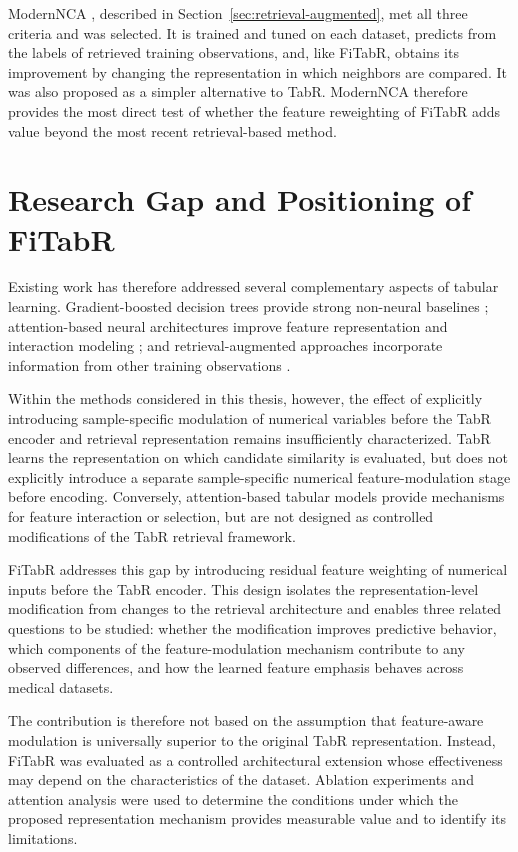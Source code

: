 \documentclass[11pt,a4paper,oneside, openany, reqno, chapter, nokorean]{oblivoir}
\theoremstyle{definition}
\theoremstyle{remark}
\numberwithin{equation}{chapter}
\theoremstyle{definition}
\theoremstyle{remark}
\theoremstyle{definition}
\begin{document}
ModernNCA \cite{ye2025modernnca}, described in
Section~\ref{sec:retrieval-augmented}, met all three criteria and was
selected. It is trained and tuned on each dataset, predicts from the labels of
retrieved training observations, and, like FiTabR, obtains its improvement by
changing the representation in which neighbors are compared. It was also
proposed as a simpler alternative to TabR. ModernNCA therefore provides the
most direct test of whether the feature reweighting of FiTabR adds value
beyond the most recent retrieval-based method.
\section{Research Gap and Positioning of FiTabR}

Existing work has therefore addressed several complementary aspects of tabular
learning. Gradient-boosted decision trees provide strong non-neural baselines
\cite{chen2016xgboost,ke2017lightgbm,prokhorenkova2018catboost};
attention-based neural architectures improve feature representation and
interaction modeling
\cite{huang2020tabtransformer,arik2021tabnet,somepalli2021saint}; and
retrieval-augmented approaches incorporate information from other training
observations
\cite{qin2021rim,kossen2021selfattention,gorishniy2024tabr,ye2025modernnca}.

Within the methods considered in this thesis, however, the effect of explicitly
introducing sample-specific modulation of numerical variables before the TabR
encoder and retrieval representation remains insufficiently characterized.
TabR learns the representation on which candidate similarity is evaluated, but
does not explicitly introduce a separate sample-specific numerical
feature-modulation stage before encoding. Conversely, attention-based tabular
models provide mechanisms for feature interaction or selection, but are not
designed as controlled modifications of the TabR retrieval framework.

FiTabR addresses this gap by introducing residual feature weighting of numerical inputs
before the TabR encoder. This design
isolates the representation-level modification from changes to the retrieval
architecture and enables three related questions to be studied: whether the
modification improves predictive behavior, which components of the
feature-modulation mechanism contribute to any observed differences, and how
the learned feature emphasis behaves across medical datasets.

The contribution is therefore not based on the assumption that feature-aware
modulation is universally superior to the original TabR representation.
Instead, FiTabR was evaluated as a controlled architectural extension whose
effectiveness may depend on the characteristics of the dataset. Ablation
experiments and attention analysis were used to determine the
conditions under which the proposed representation mechanism provides
measurable value and to identify its limitations.
\end{document}
